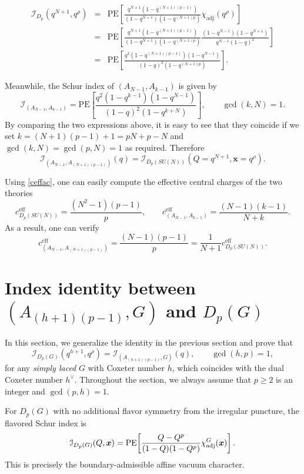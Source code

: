 \documentclass[a4paper,11pt]{article}
\theoremstyle{definition}
\theoremstyle{definition}
\theoremstyle{remark}
\newcommand{\ceff}{c^\text{eff}}
\newcommand{\be}{\begin{equation}}
\newcommand{\ee}{\end{equation}}
\newcommand{\beqn}{\begin{eqnarray}}
\newcommand{\eeqn}{\end{eqnarray}}
\begin{document}
 
\beqn
\mathcal{I}_{D_p}(q^{N+1}, q^\rho) &=& \mathrm{PE} \left[ \frac{q^{N+1}(1 - q^{(N+1)(p-1)})}{(1 - q^{N+1})(1 - q^{(N+1)p})} \chi_{\mathrm{adj}}(q^\rho) \right]
\nonumber\\
 &=& \mathrm{PE} \left[ \frac{q^{N+1}(1 - q^{(N+1)(p-1)})}{(1 - q^{N+1})(1 - q^{(N+1)p})} \frac{(1 - q^{N-1})(1 - q^{N+1})}{q^{N-1}(1 - q)^2}  \right]
\nonumber\\
 &=& \mathrm{PE} \left[ \frac{q^{2}(1 - q^{(N+1)(p-1)})(1 - q^{N-1})}{ (1 - q)^2(1 - q^{(N+1)p})}  \right] .\nonumber
\eeqn
 

Meanwhile, the Schur index of  $(A_{N-1}, A_{k-1})$ is given by  
\be\label{AkANIdx}
\mathcal{I}_{(A_{N-1}, A_{k-1})} = \mathrm{PE}\left[ \frac{q^2 (1 - q^{k-1}) (1 - q^{N-1})}{(1 - q)^2 (1 - q^{k+N})} \right],
\qquad \gcd(k,N)=1.
\ee
By comparing the two expressions above, it is easy to see that they coincide if we set $k=(N+1)(p-1)+1=pN+p-N$ and $\gcd(k,N)=\gcd(p,N)=1$ as required. Therefore 
\be
\mathcal{I}_{(A_{N-1},A_{(N+1)(p-1)})}(q) = \mathcal{I}_{D_p(SU(N))}(Q = q^{N+1}, \bm x = q^\rho).
\ee

 
Using \eqref{ceffac}, one can easily compute   the effective central charges of the two theories  
\be \ceff_{D_p(SU(N))} = \frac{(N^2 - 1)(p - 1)}{p}, \qquad
\ceff_{(A_{N-1},A_{k-1})} = \frac{(N - 1)(k - 1)}{N + k}. \ee
As a result, one can verify 
\be \ceff_ {(A_{N-1},A_{(N+1)(p-1)})} =
   \frac{(N - 1)(p - 1)}{p} 
 = \frac{1}{N + 1} \ceff_{D_p(SU(N))}.
  \ee
 

\section{Index identity between $( A_{(h+1)(p-1)},G)$ and $D_p(G)$} \label{AGDpG}
 
In this section, we generalize the identity in the previous section  and prove that
%
\be\label{DpGA}
\mathcal I_{D_p(G)}
(q^{h+1},q^\rho)
=
\mathcal I_{( A_{(h+1)(p-1)},G)}(q), \qquad \gcd(h,p)=1,
\ee
for any \emph{simply laced } $G$ with  Coxeter number $h$, which coincides with the  dual Coxeter number $h^\vee$.  Throughout the section, we always assume that  $p\ge 2$ is an integer and $\gcd(p,h)=1$.

For  $ D_p(G)$ with  no additional  flavor symmetry from  the irregular puncture, the flavored Schur index is \cite{Song:2017oew}
\be\label{DpGindex}
\mathcal I_{D_p(G)}(Q,\bm x)
=
\operatorname{PE}\!\left[
\frac{Q-Q^p}{(1-Q)(1-Q^p)}
\chi_{\rm adj}^{G}(\bm x)
\right].
\ee
This is precisely the boundary-admissible affine vacuum character.  
 
\end{document}
